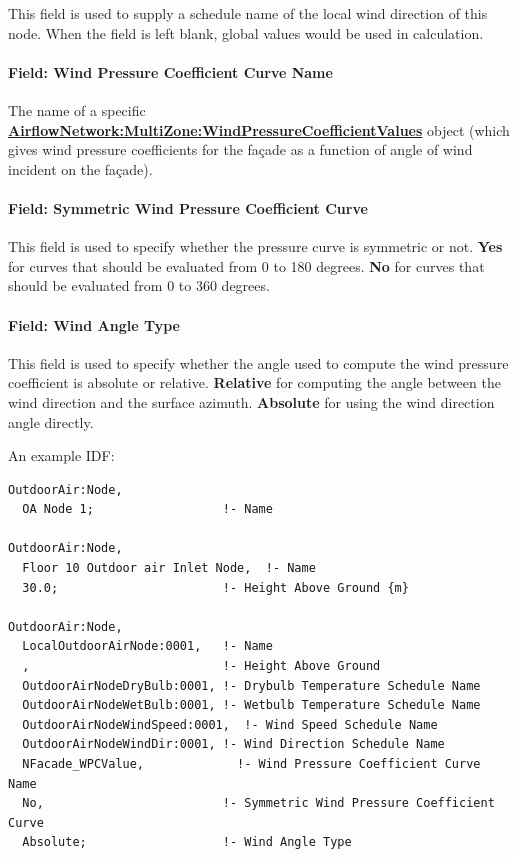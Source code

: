 This field is used to supply a schedule name of the local wind direction of this node. When the field is left blank, global values would be used in calculation.

\paragraph{Field: Wind Pressure Coefficient Curve Name}\label{field-wind-pressure-coeff-curve-name}

The name of a specific \textbf{\hyperref[airflownetworkmultizonewindpressurecoefficientvalues]{AirflowNetwork:MultiZone:WindPressureCoefficientValues}} object (which gives wind pressure coefficients for the façade as a function of angle of wind incident on the façade).

\paragraph{Field: Symmetric Wind Pressure Coefficient Curve}\label{field-sym-windp-curve-name}

This field is used to specify whether the pressure curve is symmetric or not. \textbf{Yes} for curves that should be evaluated from 0 to 180 degrees. \textbf{No} for curves that should be evaluated from 0 to 360 degrees.

\paragraph{Field: Wind Angle Type}

This field is used to specify whether the angle used to compute the wind pressure coefficient is absolute or relative. \textbf{Relative} for computing the angle between the wind direction and the surface azimuth. \textbf{Absolute} for using the wind direction angle directly.

An example IDF:

\begin{lstlisting}
OutdoorAir:Node,
  OA Node 1;                  !- Name

OutdoorAir:Node,
  Floor 10 Outdoor air Inlet Node,  !- Name
  30.0;                       !- Height Above Ground {m}

OutdoorAir:Node,
  LocalOutdoorAirNode:0001,   !- Name
  ,                           !- Height Above Ground
  OutdoorAirNodeDryBulb:0001, !- Drybulb Temperature Schedule Name
  OutdoorAirNodeWetBulb:0001, !- Wetbulb Temperature Schedule Name
  OutdoorAirNodeWindSpeed:0001,  !- Wind Speed Schedule Name
  OutdoorAirNodeWindDir:0001, !- Wind Direction Schedule Name
  NFacade_WPCValue,             !- Wind Pressure Coefficient Curve Name
  No,                         !- Symmetric Wind Pressure Coefficient Curve
  Absolute;                   !- Wind Angle Type
\end{lstlisting}

